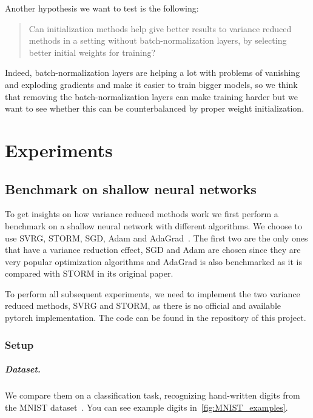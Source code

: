 \documentclass[a4paper,11pt,oneside]{report}
\begin{document}
Another hypothesis we want to test is the following:
 \begin{quotation}
  Can initialization methods help give better results to variance reduced methods in a setting without batch-normalization layers, by selecting better initial weights for training? 
 \end{quotation}
Indeed, batch-normalization layers are helping a lot with problems of vanishing and exploding gradients and make it easier to train bigger models, so we think that removing the batch-normalization layers can make training harder but we want to see whether this can be counterbalanced by proper weight initialization.


\chapter{Experiments}
\section{Benchmark on shallow neural networks}
To get insights on how variance reduced methods work we first perform a benchmark on a shallow neural network with different algorithms. We choose to use SVRG, STORM, SGD, Adam and AdaGrad~\citep{JMLR:v12:duchi11a}. The first two are the only ones that have a variance reduction effect, SGD and Adam are chosen since they are very popular optimization algorithms and AdaGrad is also benchmarked as it is compared with STORM in its original paper. 

To perform all subsequent experiments, we need to implement the two variance reduced methods, SVRG and STORM, as there is no official and available pytorch implementation. The code can be found in the repository of this project.


\subsection{Setup}
\paragraph{Dataset.}
We compare them on a classification task, recognizing hand-written digits from the MNIST dataset~\citep{lecun2010mnist}. You can see example digits in~\autoref{fig:MNIST_examples}. 
\end{document}
